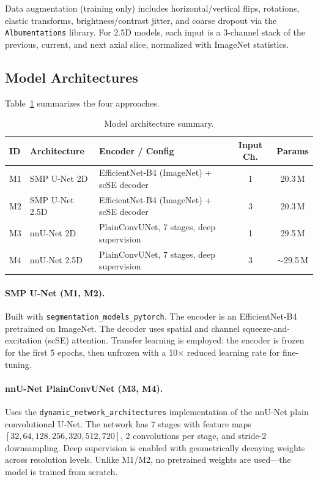 \documentclass[11pt,a4paper]{article}
\begin{document}
Data augmentation (training only) includes horizontal/vertical flips, rotations, elastic transforms, brightness/contrast jitter, and coarse dropout via the \texttt{Albumentations} library. For 2.5D models, each input is a 3-channel stack of the previous, current, and next axial slice, normalized with ImageNet statistics.

\subsection{Model Architectures}

Table~\ref{tab:architectures} summarizes the four approaches.

\begin{table}[H]
\centering
\caption{Model architecture summary.}
\label{tab:architectures}
\begin{tabular}{lllcc}
\toprule
\textbf{ID} & \textbf{Architecture} & \textbf{Encoder / Config} & \textbf{Input Ch.} & \textbf{Params} \\
\midrule
M1 & SMP U-Net 2D     & EfficientNet-B4 (ImageNet) + scSE decoder & 1 & 20.3\,M \\
M2 & SMP U-Net 2.5D   & EfficientNet-B4 (ImageNet) + scSE decoder & 3 & 20.3\,M \\
M3 & nnU-Net 2D       & PlainConvUNet, 7 stages, deep supervision  & 1 & 29.5\,M \\
M4 & nnU-Net 2.5D     & PlainConvUNet, 7 stages, deep supervision  & 3 & $\sim$29.5\,M \\
\bottomrule
\end{tabular}
\end{table}

\paragraph{SMP U-Net (M1, M2).}
Built with \texttt{segmentation\_models\_pytorch}. The encoder is an EfficientNet-B4 pretrained on ImageNet. The decoder uses spatial and channel squeeze-and-excitation (scSE) attention. Transfer learning is employed: the encoder is frozen for the first 5 epochs, then unfrozen with a 10$\times$ reduced learning rate for fine-tuning.

\paragraph{nnU-Net PlainConvUNet (M3, M4).}
Uses the \texttt{dynamic\_network\_architectures} implementation of the nnU-Net plain convolutional U-Net. The network has 7 stages with feature maps $[32, 64, 128, 256, 320, 512, 720]$, 2 convolutions per stage, and stride-2 downsampling. Deep supervision is enabled with geometrically decaying weights across resolution levels. Unlike M1/M2, no pretrained weights are used---the model is trained from scratch.
\end{document}
